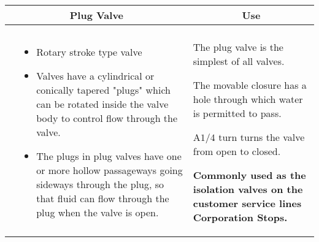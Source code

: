 \begin{landscape}
\begin{table}
\begin{tabular}{| m{7cm} m{10cm} | m{7cm} | }
    \\ \hline

\multicolumn{2}{c}{Plug Valve} & \multicolumn{1}{c}{Use} \\ \hline
    \begin{minipage}{.3\textwidth}
   \vspace{-2em} 
     \texttt{[image: PlugValve1.png]}\\
    \end{minipage}
    &
  \scriptsize{\begin{itemize}[topsep=5pt, partopsep=0pt]
  \item Rotary stroke type valve \item Valves have a cylindrical or conically tapered "plugs" which can be rotated inside the valve body to control flow through the valve. \item The plugs in plug valves have one or more hollow passageways going sideways through the plug, so that fluid can flow through the plug when the valve is open.
  \end{itemize}}  
    &
        \vspace{0.4cm}
      \begin{itemize}[leftmargin=*]
      \scriptsize{
        \item The plug valve is the simplest of all valves. \item The movable closure has a hole through which water is permitted to pass. \item $\mathrm{A} 1 / 4$ turn turns the valve from open to closed. \item \textbf{Commonly used as the isolation valves on the customer service lines Corporation Stops.} }
      \end{itemize}
  

\end{tabular}
\end{table}
\end{landscape}

